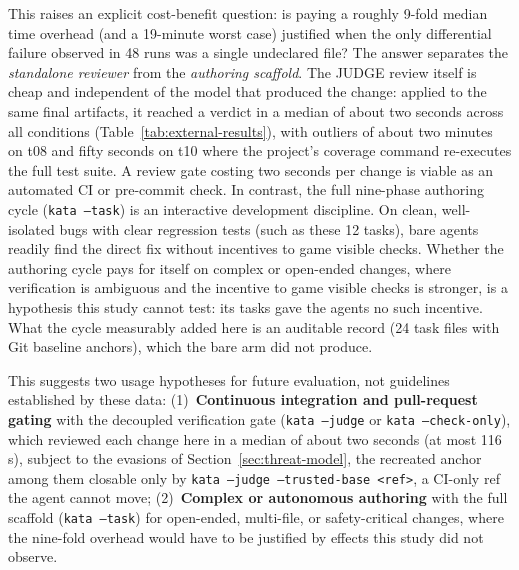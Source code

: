 \documentclass{sbc2019}%
\begin{document}
This raises an explicit cost-benefit question: is paying a roughly 9-fold
median time overhead (and a 19-minute worst case) justified when the only
differential failure observed in 48 runs was a single undeclared file?
The answer separates the \emph{standalone reviewer} from the \emph{authoring
scaffold}. The JUDGE review itself is cheap and independent of the model
that produced the change: applied to the same final artifacts, it reached a
verdict in a median of about two seconds across all conditions (Table~\ref{tab:external-results}),
with outliers of about two minutes on t08 and fifty seconds on t10 where
the project's coverage command re-executes the full test suite. A review gate
costing two seconds per change is viable as an automated CI or pre-commit
check. In contrast, the full nine-phase authoring cycle (\texttt{kata --task})
is an interactive development discipline. On clean, well-isolated bugs with
clear regression tests (such as these 12 tasks), bare agents readily find
the direct fix without incentives to game visible checks. Whether the
authoring cycle pays for itself on complex or open-ended changes, where
verification is ambiguous and the incentive to game visible checks is
stronger, is a hypothesis this study cannot test: its tasks gave the agents
no such incentive. What the cycle measurably added here is an auditable
record (24 task files with Git baseline anchors), which the bare arm did not
produce.

This suggests two usage hypotheses for future evaluation, not guidelines
established by these data:
(1)~\textbf{Continuous integration and pull-request gating} with the decoupled verification gate (\texttt{kata --judge} or \texttt{kata --check-only}), which reviewed each change here in a median of about two seconds (at most 116\,s), subject to the evasions of Section~\ref{sec:threat-model}, the recreated anchor among them closable only by \texttt{kata --judge --trusted-base <ref>}, a CI-only ref the agent cannot move;
(2)~\textbf{Complex or autonomous authoring} with the full scaffold (\texttt{kata --task}) for open-ended, multi-file, or safety-critical changes, where the nine-fold overhead would have to be justified by effects this study did not observe.
\end{document}
